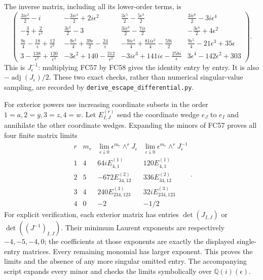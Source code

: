 \documentclass[11pt]{article}
\begin{document}
The inverse matrix, including all its lower-order terms, is
\[
\renewcommand{\arraystretch}{1.25}
\begin{pmatrix}
 \frac{3i\epsilon^2}{2}-i&-\frac{3i\epsilon^4}{2}+2i\epsilon^2&
 \frac{3\epsilon^5}{2}-\frac{5\epsilon^3}{2}&\frac{3i\epsilon^6}{2}-3i\epsilon^4\\
 -\frac32+\frac2{\epsilon^2}&\frac{3\epsilon^2}{2}-3&
 \frac{3i\epsilon^3}{2}-\frac{7i\epsilon}{2}&-\frac{3\epsilon^4}{2}+4\epsilon^2\\
 \frac{9\epsilon}{4}-\frac{18}{\epsilon}+\frac{12}{\epsilon^3}&
 -\frac{9\epsilon^3}{4}+\frac{39\epsilon}{2}-\frac{24}{\epsilon}&
 -\frac{9i\epsilon^4}{4}+\frac{81i\epsilon^2}{4}-\frac{59i}{2}&
 \frac{9\epsilon^5}{4}-21\epsilon^3+35\epsilon\\
 3-\frac{138}{\epsilon^2}+\frac{120}{\epsilon^4}&
 -3\epsilon^2+140-\frac{212}{\epsilon^2}&
 -3i\epsilon^3+141i\epsilon-\frac{258i}{\epsilon}&
 3\epsilon^4-142\epsilon^2+303
\end{pmatrix}.
\tag{FC58}
\]
This is $J_\epsilon^{-1}$: multiplying FC57 by FC58 gives the identity
entry by entry. It is also $-\operatorname{adj}(J_\epsilon)/2$.
These two exact checks, rather than numerical singular-value sampling,
are recorded by \texttt{derive\_escape\_differential.py}.

For exterior powers use increasing coordinate subsets in the order
$1=a,2=y,3=z,4=w$. Let $E^{(r)}_{I,J}$ send the coordinate wedge
$e_J$ to $e_I$ and annihilate the other coordinate wedges. Expanding
the minors of FC57 proves all four finite matrix limits
\[
\begin{array}{c|c|c|c}
 r&m_r&\displaystyle\lim_{\epsilon\downarrow0}
       \epsilon^{m_r}\wedge^rJ_\epsilon&
 \displaystyle\lim_{\epsilon\downarrow0}
       \epsilon^{m_r}\wedge^rJ_\epsilon^{-1}\\\hline
 1&4&64iE^{(1)}_{4,1}&120E^{(1)}_{4,1}\\
 2&5&-672E^{(2)}_{34,12}&336E^{(2)}_{34,12}\\
 3&4&240E^{(3)}_{234,123}&32iE^{(3)}_{234,123}\\
 4&0&-2&-1/2
\end{array}.
\tag{FC59}
\]
For explicit verification, each exterior matrix has entries
$\det(J_{I,J})$ or $\det((J^{-1})_{I,J})$. Their minimum Laurent
exponents are respectively $-4,-5,-4,0$; the coefficients at those
exponents are exactly the displayed single-entry matrices. Every
remaining monomial has larger exponent. This proves the limits and
the absence of any more singular omitted entry. The accompanying
script expands every minor and checks the limits symbolically over
$\mathbb Q(i)(\epsilon)$.
\end{document}
